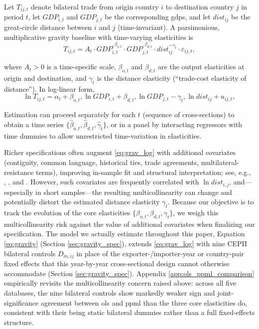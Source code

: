 \documentclass[preprint, 3p,
authoryear]{elsarticle} %
\begin{document}
Let \(T_{ij,t}\) denote bilateral trade from origin country \(i\) to
destination country \(j\) in period \(t\), let \(GDP_{i,t}\) and
\(GDP_{j,t}\) be the corresponding \glspl{gdp}, and let \(dist_{ij}\) be
the great-circle distance between \(i\) and \(j\) (time-invariant). A
parsimonious, multiplicative gravity baseline with time-varying
elasticities is \begin{equation}
T_{ij,t} = A_t \cdot GDP_{i,t}^{,\beta_{o,t}} \cdot GDP_{j,t}^{,\beta_{d,t}} \cdot  dist_{ij}^{-\gamma_t} \cdot \varepsilon_{ij,t},
\label{eq:grav_mult}
\end{equation}

\noindent where \(A_t>0\) is a time-specific scale, \(\beta_{o,t}\) and
\(\beta_{d,t}\) are the output elasticities at origin and destination,
and \(\gamma_t\) is the distance elasticity (``trade-cost elasticity of
distance''). In log-linear form, \begin{equation}
\ln T_{ij,t} = \alpha_t + \beta_{o,t},\ln GDP_{i,t} + \beta_{d,t},\ln GDP_{j,t} - \gamma_t,\ln dist_{ij} + u_{ij,t},
\label{eq:grav_log}
\end{equation}

Estimation can proceed separately for each \(t\) (sequence of
cross-sections) to obtain a time series
\(\{\widehat{\beta}_{o,t},\widehat{\beta}_{d,t},\widehat{\gamma}_{t}\}\),
or in a panel by interacting regressors with time dummies to allow
unrestricted time-variation in elasticities.

Richer specifications often augment \eqref{eq:grav_log} with additional
covariates (contiguity, common language, historical ties, trade
agreements, multilateral-resistance terms), improving in-sample fit and
structural interpretation; see, e.g., \citet{anderson2003},
\citet{headmayer2014}, and \citet{anderson2011}. However, such
covariates are frequently correlated with \(\ln dist_{i,j}\),
and---especially in short samples---the resulting multicollinearity can
change and potentially distort the estimated distance elasticity
\(\gamma_t\). Because our objective is to track the evolution of the
core elasticities \(\{\beta_{o,t},\beta_{d,t},\gamma_{t}\}\), we weigh
this multicollinearity risk against the value of additional covariates
when finalizing our specification. The model we actually estimate
throughout this paper, Equation \eqref{eq:gravity} (Section
\ref{sec:gravity_spec}), extends \eqref{eq:grav_log} with nine CEPII
bilateral controls \(D_{m,ij}\) \citep{conte2022cepii} in place of the
exporter-/importer-year or country-pair fixed effects that this
year-by-year cross-sectional design cannot otherwise accommodate
(Section \ref{sec:gravity_spec}). Appendix \ref{app:ols_ppml_comparison}
empirically revisits the multicollinearity concern raised above: across
all five databases, the nine bilateral controls show markedly weaker
sign and joint-significance agreement between \gls{ols} and \gls{ppml}
than the three core elasticities do, consistent with their being static
bilateral dummies rather than a full fixed-effects structure.
\end{document}
